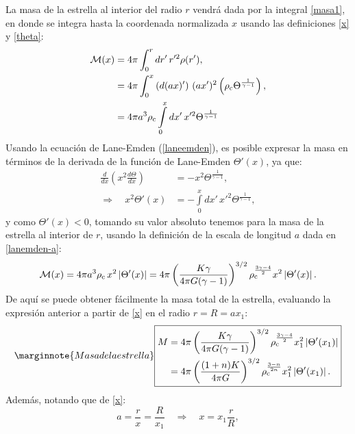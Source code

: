 La masa de la estrella al interior del radio $r$ vendrá dada  por la integral \eqref{masa1}, en donde se integra hasta la coordenada normalizada $x$ usando las definiciones \eqref{x} y \eqref{theta}:
\begin{align}
\mathcal{M}(x)&=4\pi\int_0^r dr'\,r'^2\rho(r'),\\
&=4\pi\int_0^{x} \left(d(ax)'\right)\,(ax')^{2}\left(\rho_{\rm c} \Theta^{\frac{1}{\gamma-1}}\right)\label{masapol1},\\
&=4\pi a^3\rho_{\rm c}\int\limits_0^{x}dx'\, x'^2\Theta^{\frac{1}{\gamma-1}}
\end{align}
Usando la ecuación de Lane-Emden (\ref{laneemden}), es posible expresar la masa en términos de la derivada de la función de Lane-Emden  $\Theta'(x)$, ya que:
\begin{align}
 \frac{d}{dx}\left(x^2\frac{d\Theta}{dx}\right)&=-x^2\Theta^{\frac{1}{\gamma-1}},\\
\Rightarrow\quad x^{2}\Theta'(x)&=-\int\limits_0^{x}dx'\,x'^2\Theta^{\frac{1}{\gamma-1}},\label{masapol2}
\end{align}
y como $\Theta'(x)<0$, tomando su valor absoluto tenemos para la masa de la estrella al interior de $r$, usando la definición de la escala de longitud $a$ dada en \eqref{lanemden-a}:
\begin{equation}
 \mathcal{M}(x)=4\pi a^3\rho_{\rm c}\, x^2\left|\Theta'(x)\right|=4\pi\left(\frac{K\gamma}{4\pi G(\gamma-1)}\right)^{3/2}\rho_{\rm c}^{\frac{3\gamma-4}{2}}x^2\left|\Theta'(x)\right|.\label{masaparcial-laneemden}
\end{equation}
De aquí se puede obtener fácilmente la masa total de la estrella, evaluando la expresión anterior a partir de \eqref{x} en el radio $r=R=ax_1$:
\begin{equation}\label{masalaneemden}\marginnote{Masa de la estrella}
 \boxed{
\begin{aligned}M&=4\pi\left(\frac{K\gamma}{4\pi G(\gamma-1)}\right)^{3/2}\rho_{\rm c}^{\frac{3\gamma-4}{2}}x_1^2\left|\Theta'(x_1)\right|\\
 &=4\pi\left(\frac{(1+n)K}{4\pi G}\right)^{3/2}\rho_{\rm c}^{\frac{3-n}{2n}}x_1^2\left|\Theta'(x_1)\right|.
\end{aligned}}
\end{equation}
Además, notando que de \eqref{x}:
\begin{equation}\label{laneemden-rax}
a=\frac{r}{x}=\frac{R}{x_1}\quad\Rightarrow\quad x=x_1\frac{r}{R},
\end{equation}
